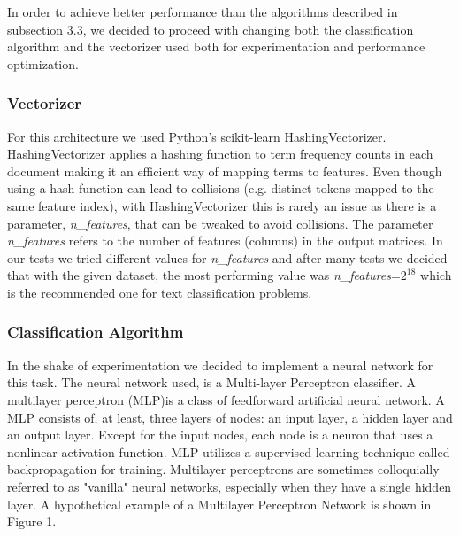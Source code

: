 In order to achieve better performance than the algorithms described in subsection 3.3, we decided to proceed with changing both the classification algorithm and the vectorizer used both for experimentation and performance optimization.

\subsubsection{Vectorizer}
For this architecture we used Python's scikit-learn HashingVectorizer. HashingVectorizer applies a hashing function to term frequency counts in each document making it an efficient way of mapping terms to features. Even though using a hash function can lead to collisions (e.g. distinct tokens mapped to the same feature index), with HashingVectorizer this is rarely an issue as there is a parameter, \textit{n\_features}, that can be tweaked to avoid collisions. The parameter \textit{n\_features} refers to the number of features (columns) in the output matrices. In our tests we tried different values for \textit{n\_features} and after many tests we decided that with the given dataset, the most performing value was \textit{n\_features}=$2^{18}$ which is the recommended one for text classification problems.

\subsubsection{Classification Algorithm}
In the shake of experimentation we decided to implement a neural network for this task. The neural network used, is a Multi-layer Perceptron classifier. A multilayer perceptron (MLP)\cite{MLP}is a class of feedforward artificial neural network. A MLP consists of, at least, three layers of nodes: an input layer, a hidden layer and an output layer. Except for the input nodes, each node is a neuron that uses a nonlinear activation function. MLP utilizes a supervised learning technique called backpropagation for training. Multilayer perceptrons are sometimes colloquially referred to as "vanilla" neural networks, especially when they have a single hidden layer. A hypothetical example of a Multilayer Perceptron Network is shown in Figure 1. 

